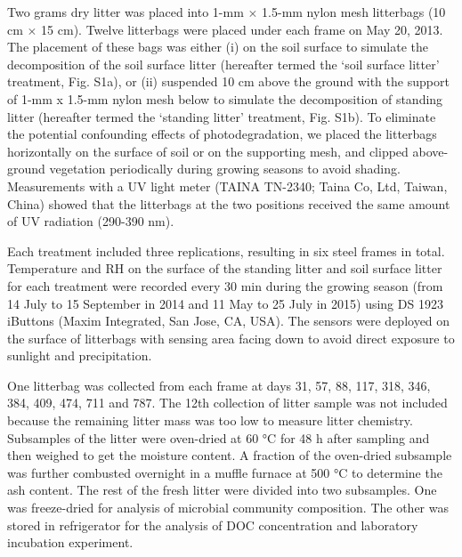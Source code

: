 \documentclass[
]{article}
\begin{document}
Two grams dry litter was placed into 1-mm \(\times\) 1.5-mm nylon mesh
litterbags (10 cm \(\times\) 15 cm). Twelve litterbags were placed under
each frame on May 20, 2013. The placement of these bags was either (i)
on the soil surface to simulate the decomposition of the soil surface
litter (hereafter termed the `soil surface litter' treatment, Fig. S1a),
or (ii) suspended 10 cm above the ground with the support of 1-mm x
1.5-mm nylon mesh below to simulate the decomposition of standing litter
(hereafter termed the `standing litter' treatment, Fig. S1b). To
eliminate the potential confounding effects of photodegradation, we
placed the litterbags horizontally on the surface of soil or on the
supporting mesh, and clipped above-ground vegetation periodically during
growing seasons to avoid shading. Measurements with a UV light meter
(TAINA TN-2340; Taina Co, Ltd, Taiwan, China) showed that the litterbags
at the two positions received the same amount of UV radiation (290-390
nm).

Each treatment included three replications, resulting in six steel
frames in total. Temperature and RH on the surface of the standing
litter and soil surface litter for each treatment were recorded every 30
min during the growing season (from 14 July to 15 September in 2014 and
11 May to 25 July in 2015) using DS 1923 iButtons (Maxim Integrated, San
Jose, CA, USA). The sensors were deployed on the surface of litterbags
with sensing area facing down to avoid direct exposure to sunlight and
precipitation.

One litterbag was collected from each frame at days 31, 57, 88, 117,
318, 346, 384, 409, 474, 711 and 787. The 12th collection of litter
sample was not included because the remaining litter mass was too low to
measure litter chemistry. Subsamples of the litter were oven-dried at 60
°C for 48 h after sampling and then weighed to get the moisture content.
A fraction of the oven-dried subsample was further combusted overnight
in a muffle furnace at 500 °C to determine the ash content. The rest of
the fresh litter were divided into two subsamples. One was freeze-dried
for analysis of microbial community composition. The other was stored in
refrigerator for the analysis of DOC concentration and laboratory
incubation experiment.
\end{document}
